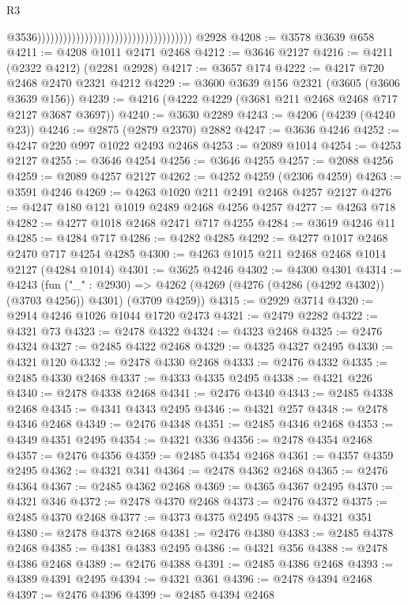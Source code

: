 \begin{lexlean}{R3}
\begin{coremodule}
                                                                            @3536))))))))))))))))))))))))))))))))))))
    @2928
@4208 := @3578 @3639 @658
@4211 := @4208 @1011 @2471 @2468
@4212 := @3646 @2127
@4216 := @4211 (@2322 @4212) (@2281 @2928)
@4217 := @3657 @174
@4222 := @4217 @720 @2468 @2470 @2321 @4212
@4229 := @3600 @3639 @156 @2321 (@3605 (@3606 @3639 @156))
@4239 := @4216 (@4222 @4229 (@3681 @211 @2468 @2468 @717 @2127 @3687 @3697))
@4240 := @3630 @2289
@4243 := @4206 (@4239 (@4240 @23))
@4246 := @2875 (@2879 @2370) @2882
@4247 := @3636 @4246
@4252 := @4247 @220 @997 @1022 @2493 @2468
@4253 := @2089 @1014
@4254 := @4253 @2127
@4255 := @3646 @4254
@4256 := @3646 @4255
@4257 := @2088 @4256
@4259 := @2089 @4257 @2127
@4262 := @4252 @4259 (@2306 @4259)
@4263 := @3591 @4246
@4269 := @4263 @1020 @211 @2491 @2468 @4257 @2127
@4276 := @4247 @180 @121 @1019 @2489 @2468 @4256 @4257
@4277 := @4263 @718
@4282 := @4277 @1018 @2468 @2471 @717 @4255
@4284 := @3619 @4246 @11
@4285 := @4284 @717
@4286 := @4282 @4285
@4292 := @4277 @1017 @2468 @2470 @717 @4254 @4285
@4300 := @4263 @1015 @211 @2468 @2468 @1014 @2127 (@4284 @1014)
@4301 := @3625 @4246
@4302 := @4300 @4301
@4314 := @4243
    (fun ("_" : @2930) =>
    @4262 (@4269 (@4276 (@4286 (@4292 @4302)) (@3703 @4256)) @4301) (@3709 @4259))
@4315 := @2929 @3714
@4320 := @2914 @4246 @1026 @1044 @1720 @2473
@4321 := @2479 @2282
@4322 := @4321 @73
@4323 := @2478 @4322
@4324 := @4323 @2468
@4325 := @2476 @4324
@4327 := @2485 @4322 @2468
@4329 := @4325 @4327 @2495
@4330 := @4321 @120
@4332 := @2478 @4330 @2468
@4333 := @2476 @4332
@4335 := @2485 @4330 @2468
@4337 := @4333 @4335 @2495
@4338 := @4321 @226
@4340 := @2478 @4338 @2468
@4341 := @2476 @4340
@4343 := @2485 @4338 @2468
@4345 := @4341 @4343 @2495
@4346 := @4321 @257
@4348 := @2478 @4346 @2468
@4349 := @2476 @4348
@4351 := @2485 @4346 @2468
@4353 := @4349 @4351 @2495
@4354 := @4321 @336
@4356 := @2478 @4354 @2468
@4357 := @2476 @4356
@4359 := @2485 @4354 @2468
@4361 := @4357 @4359 @2495
@4362 := @4321 @341
@4364 := @2478 @4362 @2468
@4365 := @2476 @4364
@4367 := @2485 @4362 @2468
@4369 := @4365 @4367 @2495
@4370 := @4321 @346
@4372 := @2478 @4370 @2468
@4373 := @2476 @4372
@4375 := @2485 @4370 @2468
@4377 := @4373 @4375 @2495
@4378 := @4321 @351
@4380 := @2478 @4378 @2468
@4381 := @2476 @4380
@4383 := @2485 @4378 @2468
@4385 := @4381 @4383 @2495
@4386 := @4321 @356
@4388 := @2478 @4386 @2468
@4389 := @2476 @4388
@4391 := @2485 @4386 @2468
@4393 := @4389 @4391 @2495
@4394 := @4321 @361
@4396 := @2478 @4394 @2468
@4397 := @2476 @4396
@4399 := @2485 @4394 @2468

\end{coremodule}
\end{lexlean}
